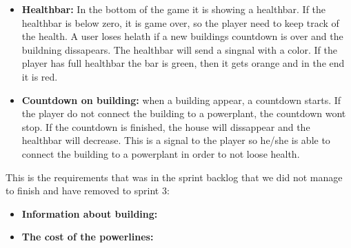 \begin{itemize}
		\item {\bf Healthbar:} In the bottom of the game it is showing a healthbar. If the 
		healthbar is below zero, it is game over, so the player need to keep track of the health.
		A user loses helath if a new buildings countdown is over and the buildning dissapears.
		The healthbar will send a singnal with a color. If the player has full healthbar the bar is
		green, then it gets orange and in the end it is red. 

		\item {\bf Countdown on building:} when a building appear, a countdown starts. If the player
		do not connect the building to a powerplant, the countdown wont stop. If the countdown is
		finished, the house will dissappear and the healthbar will decrease. This is a signal to
		the player so he/she is able to connect the building to a powerplant in order to not loose
		health. 

	\end{itemize}

	This is the requirements that was in the sprint backlog that we did not
	manage to finish and have removed to sprint 3:

	\begin{itemize}
		\item {\bf Information about building:}

		\item {\bf The cost of the powerlines:}

	\end{itemize}


